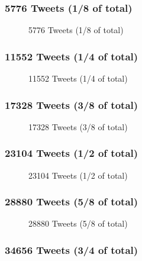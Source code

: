 \documentclass{article}
\begin{document}
\subsubsection{5776 Tweets (1/8 of total)}

\begin{figure}[H]
	\caption{5776 Tweets (1/8 of total)}
\end{figure}

\subsubsection{11552 Tweets (1/4 of total)}

\begin{figure}[H]
	\caption{11552 Tweets (1/4 of total)}
\end{figure}

\subsubsection{17328 Tweets (3/8 of total)}

\begin{figure}[H]
	\caption{17328 Tweets (3/8 of total)}
\end{figure}

\subsubsection{23104 Tweets (1/2 of total)}

\begin{figure}[H]
	\caption{23104 Tweets (1/2 of total)}
\end{figure}

\subsubsection{28880 Tweets (5/8 of total)}

\begin{figure}[H]
	\caption{28880 Tweets (5/8 of total)}
\end{figure}

\subsubsection{34656 Tweets (3/4 of total)}
\end{document}
